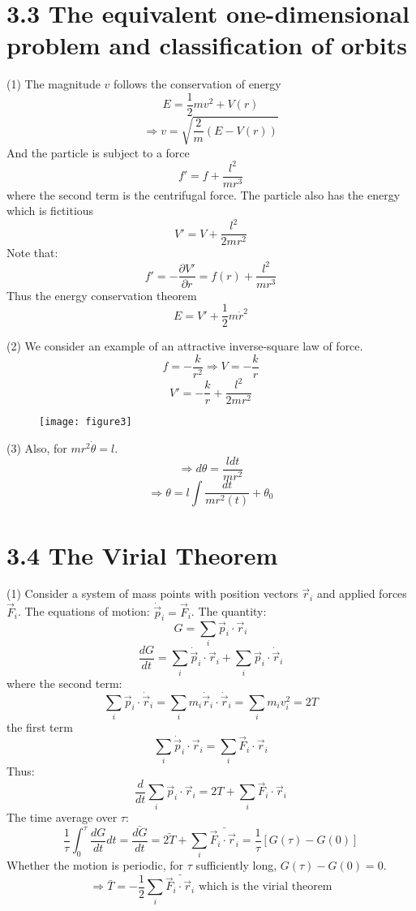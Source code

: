 \documentclass{article}
\begin{document}
    \section*{3.3 The equivalent one-dimensional problem and classification of orbits}
    
    (1) The magnitude $v$ follows the conservation of energy
    \[ E = \frac{1}{2}mv^2 + V(r) \]
    \[ \Rightarrow v = \sqrt{\frac{2}{m}(E - V(r))} \]
    And the particle is subject to a force
    \[ f' = f + \frac{l^2}{mr^3} \]
    where the second term is the centrifugal force.
    The particle also has the energy which is fictitious
    \[ V' = V + \frac{l^2}{2mr^2} \]
    Note that:
    \[ f' = -\frac{\partial V'}{\partial r} = f(r) + \frac{l^2}{mr^3} \]
    Thus the energy conservation theorem
    \[ E = V' + \frac{1}{2}m\dot{r}^2 \]
    
    (2) We consider an example of an attractive inverse-square law of force.
    \[ f = -\frac{k}{r^2} \Rightarrow V = -\frac{k}{r} \]
    \[ V' = -\frac{k}{r} + \frac{l^2}{2mr^2} \]
    
    \begin{figure}[h]
    	\centering
    	\texttt{[image: figure3]}
    	\caption{}
    	\label{fig:figure3}
    \end{figure}
    
    (3) Also, for $mr^2\dot{\theta} = l$.
    \[ \Rightarrow d\theta = \frac{ldt}{mr^2} \]
    \[ \Rightarrow \theta = l\int\frac{dt}{mr^2(t)} + \theta_0 \]
    
    \section*{3.4 The Virial Theorem}
    (1) Consider a system of mass points with position vectors $\vec{r}_i$ and applied forces $\vec{F}_i$.
    The equations of motion: $\dot{\vec{p}}_i = \vec{F}_i$.
    The quantity:
    \[ G = \sum_i \vec{p}_i \cdot \vec{r}_i \]
    \[ \frac{dG}{dt} = \sum_i \dot{\vec{p}}_i \cdot \vec{r}_i + \sum_i \vec{p}_i \cdot \dot{\vec{r}}_i \]
    where the second term:
    \[ \sum_i \vec{p}_i \cdot \dot{\vec{r}}_i = \sum_i m_i \dot{\vec{r}}_i \cdot \dot{\vec{r}}_i = \sum_i m_i v_i^2 = 2T \]
    the first term
    \[ \sum_i \dot{\vec{p}}_i \cdot \vec{r}_i = \sum_i \vec{F}_i \cdot \vec{r}_i \]
    Thus:
    \[ \frac{d}{dt} \sum_i \vec{p}_i \cdot \vec{r}_i = 2T + \sum_i \vec{F}_i \cdot \vec{r}_i \]
    The time average over $\tau$:
    \[ \frac{1}{\tau}\int_0^\tau \frac{dG}{dt} dt = \bar{\frac{dG}{dt}} = \bar{2T} + \sum_i \bar{\vec{F}_i \cdot \vec{r}_i} = \frac{1}{\tau}[G(\tau) - G(0)] \]
    Whether the motion is periodic, for $\tau$ sufficiently long, $G(\tau) - G(0) = 0$.
    \[ \Rightarrow \bar{T} = -\frac{1}{2}\sum_i \bar{\vec{F}_i \cdot \vec{r}_i} \text{ which is the virial theorem} \]
    
\end{document}
